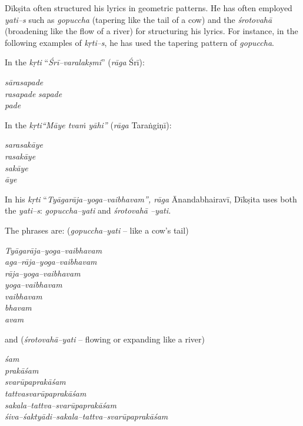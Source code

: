 Dīkṣita often structured his lyrics in geometric patterns. He has often employed \textit{yati–s} such as \textit{gopuccha} (tapering like the tail of a cow) and the \textit{śrotovahā} (broadening like the flow of a river) for structuring his lyrics. For instance, in the following examples of \textit{kṛti–s}, he has used the tapering pattern of \textit{gopuccha}.

In the \textit{kṛti} “\textit{Śrī–varalakṣmi}” (\textit{rāga} Śrī):

\begin{myquote}
\textit{sārasapade}\\\textit{rasapade} \textit{sapade}\\\textit{pade}
\end{myquote}

In the \textit{kṛti“Māye tvaṁ yāhi”} (\textit{rāga} Taraṅgiṇī):

\begin{myquote}
\textit{sarasakāye}\\\textit{rasakāye}\\\textit{sakāye}\\\textit{āye}
\end{myquote}

In his \textit{kṛti} “\textit{Tyāgarāja–yoga–vaibhavam”, rāga} Ānandabhairavī, Dīkṣita uses both the \textit{yati–s}: \textit{gopuccha–yati} and \textit{śrotovahā –yati.}

The phrases are: (\textit{gopuccha–yati} – like a cow’s tail)

\begin{myquote}
\textit{Tyāgarāja–yoga–vaibhavam}\\\textit{aga–rāja–yoga–vaibhavam}\\\textit{rāja–yoga–vaibhavam}\\\textit{yoga–vaibhavam}\\\textit{vaibhavam}\\\textit{bhavam}\\\textit{avam}
\end{myquote}

and (\textit{śrotovahā–yati} – flowing or expanding like a river)

\begin{myquote}
\textit{śam}\\\textit{prakāśam}\\\textit{svarūpaprakāśam}\\\textit{tattvasvarūpaprakāśam}\\\textit{sakala–tattva–svarūpaprakāśam}\\\textit{śiva–śaktyādi–sakala–tattva–svarūpaprakāśam}
\end{myquote}


